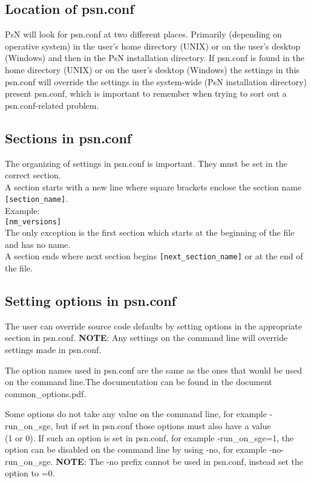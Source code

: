 \subsection{Location of psn.conf}
PsN will look for psn.conf at two different places. Primarily (depending on operative system) in the user's home directory (UNIX) or on the user's desktop (Windows) and then in the PsN installation directory. If psn.conf is found in the home directory (UNIX) or on the user's desktop (Windows) the settings in this psn.conf will override the settings in the system-wide (PsN installation directory) present psn.conf, which is important to remember when trying to sort out a psn.conf-related problem.

\subsection{Sections in psn.conf}
The organizing of settings in psn.conf is important. They must be set in the correct section.\\
A section starts with a new line where square brackets enclose the section name
\verb|[section_name]|. \\
Example:\\
\verb|[nm_versions]|\\
The only exception is the first section which starts at the beginning of the file and has no name.\\
A section ends where next section begins
\verb|[next_section_name]| or at the end of the file.

\subsection{Setting options in psn.conf}
The user can override source code defaults by setting options in the appropriate section in psn.conf. \textbf{NOTE}: Any settings on the command line will override settings made in psn.conf. 

The option names used in psn.conf are the same as the ones that would be used on the command line.The documentation can be found in the document common\_options.pdf. 

Some options do not take any value on the command line, for example -run\_on\_sge, but if set in psn.conf those options must also have a value\\ (1 or 0). If such an option is set in psn.conf, for example
-run\_on\_sge=1, the option can be disabled on the command line by using -no, for example 
-no-run\_on\_sge. \textbf{NOTE}: The -no prefix cannot be used in psn.conf, instead set the option to =0.
